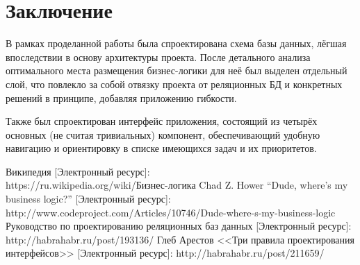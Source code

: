 \documentclass[a4paper, 14pt]{extarticle}
\begin{document}
\section{Заключение}
В рамках проделанной работы была спроектирована схема базы данных, лёгшая впоследствии в основу архитектуры проекта. После детального анализа оптимального места размещения бизнес-логики для неё был выделен отдельный слой, что повлекло за собой отвязку проекта от реляционных БД и конкретных решений в принципе, добавляя приложению гибкости.

Также был спроектирован интерфейс приложения, состоящий из четырёх основных (не считая тривиальных) компонент, обеспечивающий удобную навигацию и ориентировку в списке имеющихся задач и их приоритетов.

\begin{thebibliography}{}
\bibitem{} Википедия [Электронный ресурс]: \\https://ru.wikipedia.org/wiki/Бизнес-логика
\bibitem{} Chad Z. Hower ``Dude, where's my business logic?'' [Электронный ресурс]: http://www.codeproject.com/Articles/10746/Dude-where-s-my-business-logic
\bibitem{} Руководство по проектированию реляционных баз данных [Электронный ресурс]: http://habrahabr.ru/post/193136/
\bibitem{} Глеб Арестов <<Три правила проектирования интерфейсов>> [Электронный ресурс]: http://habrahabr.ru/post/211659/
\end{thebibliography}
\end{document}
